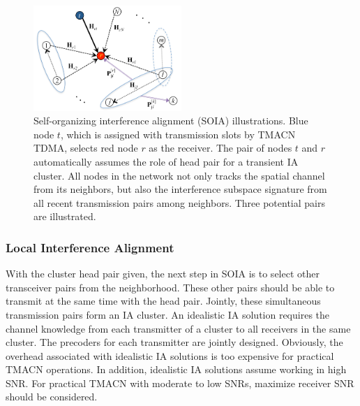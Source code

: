\documentclass[letterpaper,11pt]{article}
\begin{document}
\begin{figure}[h]
\begin{center}
\includegraphics[width=0.5\textwidth]{../figures/InterferenceAlignment_1.png}
\caption{\small Self-organizing interference alignment (SOIA) illustrations. Blue node $t$, which is assigned with transmission slots by TMACN TDMA, selects red node $r$ as the receiver. The pair of nodes $t$ and $r$ automatically assumes the role of head pair for a transient IA cluster. All nodes in the network not only tracks the spatial channel from its neighbors, but also the interference subspace signature from all recent transmission pairs among neighbors. Three potential pairs are illustrated.}
\label{fig:IA_SingleRx}
\end{center}
\end{figure}

\subsubsection{Local Interference Alignment}\label{LocalIA}

With the cluster head pair given, the next step in SOIA is to select other transceiver pairs from the neighborhood. These other pairs should be able to transmit at the same time with the head pair. Jointly, these simultaneous transmission pairs form an IA cluster.  An idealistic IA solution requires the channel knowledge from each transmitter of a cluster to all receivers in the same cluster. The precoders for each transmitter are jointly designed. Obviously, the overhead associated with idealistic IA solutions is too expensive for practical TMACN operations. In addition, idealistic IA solutions assume working in high SNR. For practical TMACN with moderate to low SNRs, maximize receiver SNR should be considered.
\end{document}
